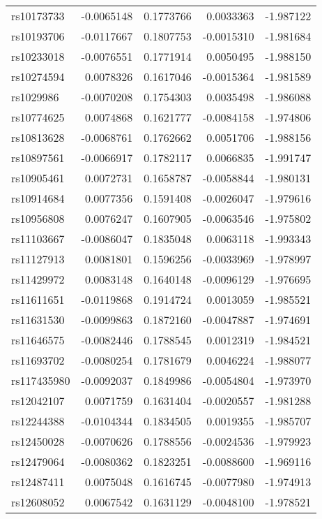 \documentclass[
]{article}
\theoremstyle{plain}
\begin{document}
{\begin{longtable}[t]{lrrrr}
\endfoot
\bottomrule
\endlastfoot
rs10173733 & -0.0065148 & 0.1773766 & 0.0033363 & -1.987122\\
rs10193706 & -0.0117667 & 0.1807753 & -0.0015310 & -1.981684\\
rs10233018 & -0.0076551 & 0.1771914 & 0.0050495 & -1.988150\\
rs10274594 & 0.0078326 & 0.1617046 & -0.0015364 & -1.981589\\
rs1029986 & -0.0070208 & 0.1754303 & 0.0035498 & -1.986088\\
\addlinespace
rs10774625 & 0.0074868 & 0.1621777 & -0.0084158 & -1.974806\\
rs10813628 & -0.0068761 & 0.1762662 & 0.0051706 & -1.988156\\
rs10897561 & -0.0066917 & 0.1782117 & 0.0066835 & -1.991747\\
rs10905461 & 0.0072731 & 0.1658787 & -0.0058844 & -1.980131\\
rs10914684 & 0.0077356 & 0.1591408 & -0.0026047 & -1.979616\\
\addlinespace
rs10956808 & 0.0076247 & 0.1607905 & -0.0063546 & -1.975802\\
rs11103667 & -0.0086047 & 0.1835048 & 0.0063118 & -1.993343\\
rs11127913 & 0.0081801 & 0.1596256 & -0.0033969 & -1.978997\\
rs11429972 & 0.0083148 & 0.1640148 & -0.0096129 & -1.976695\\
rs11611651 & -0.0119868 & 0.1914724 & 0.0013059 & -1.985521\\
\addlinespace
rs11631530 & -0.0099863 & 0.1872160 & -0.0047887 & -1.974691\\
rs11646575 & -0.0082446 & 0.1788545 & 0.0012319 & -1.984521\\
rs11693702 & -0.0080254 & 0.1781679 & 0.0046224 & -1.988077\\
rs117435980 & -0.0092037 & 0.1849986 & -0.0054804 & -1.973970\\
rs12042107 & 0.0071759 & 0.1631404 & -0.0020557 & -1.981288\\
\addlinespace
rs12244388 & -0.0104344 & 0.1834505 & 0.0019355 & -1.985707\\
rs12450028 & -0.0070626 & 0.1788556 & -0.0024536 & -1.979923\\
rs12479064 & -0.0080362 & 0.1823251 & -0.0088600 & -1.969116\\
rs12487411 & 0.0075048 & 0.1616745 & -0.0077980 & -1.974913\\
rs12608052 & 0.0067542 & 0.1631129 & -0.0048100 & -1.978521\\

\end{longtable}}
\end{document}
